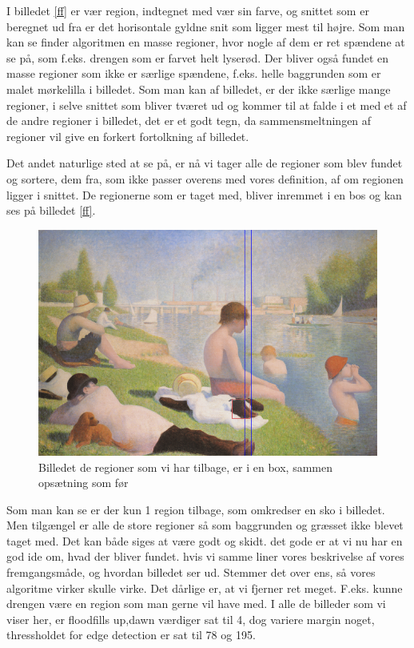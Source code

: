 I billedet \ref{ff} er vær region, indtegnet med vær sin farve, og snittet
som er beregnet ud fra er det horisontale gyldne snit som ligger mest
til højre. Som man kan se finder algoritmen en masse regioner, hvor
nogle af dem er ret spændene at se på, som f.eks. drengen som er farvet
helt lyserød. Der bliver også fundet en masse regioner som ikke er
særlige spændene, f.eks. helle baggrunden som er malet mørkelilla i
billedet. Som man kan af billedet, er der ikke særlige mange regioner, i
selve snittet som bliver tværet ud og kommer til at falde i et med et af
de andre regioner i billedet, det er et godt tegn, da sammensmeltningen af
regioner vil give en forkert fortolkning af billedet.

Det andet naturlige sted at se på, er nå vi tager alle de regioner som
blev fundet og sortere, dem fra, som ikke passer overens med vores
definition, af om regionen ligger i snittet. De regionerne som er taget
med, bliver inremmet i en bos og kan ses på billedet \ref{ff}. 

\begin{figure}[h!!]
	\begin{center}
		\includegraphics[scale=0.42,angle=0]{afsnit/afprovning/billeder/boindingboxbilledet.png}
	\end{center}
	\caption[]{Billedet de regioner som vi har tilbage, er i en box, sammen opsætning som før}
	\label{blob}
\end{figure}

Som man kan se er der kun 1 region tilbage, som omkredser en sko i
billedet. Men tilgængel er alle de store regioner så som baggrunden og
græsset ikke blevet taget med. Det kan både siges at være godt og skidt.
det gode er at vi nu har en god ide om, hvad der bliver fundet. hvis vi
samme liner vores beskrivelse af vores fremgangsmåde, og hvordan
billedet ser ud. Stemmer det over ens, så vores algoritme virker skulle
virke. Det dårlige er, at vi fjerner ret meget. F.eks. kunne drengen
være en region som man gerne vil have med.
I alle de billeder som vi viser her, er floodfills up,dawn værdiger sat
til 4, dog variere margin noget, thressholdet for edge detection er sat
til 78 og 195.

